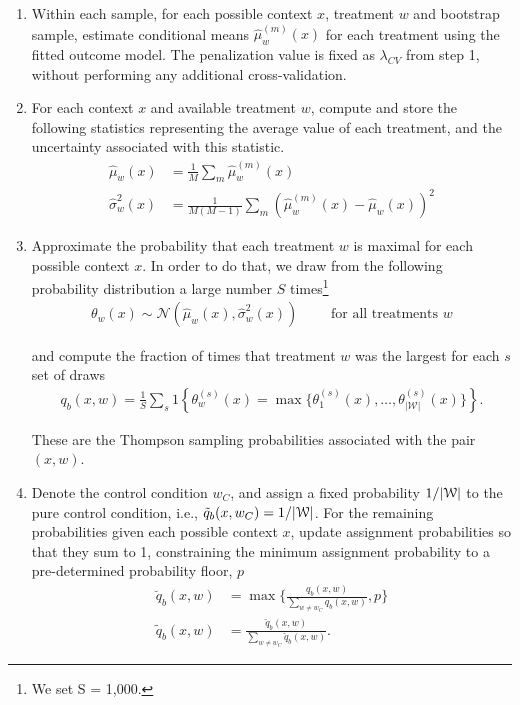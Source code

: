 \documentclass[letterpaper, 12pt, parskip=full,]{scrartcl}
\begin{document}
\begin{enumerate}
\begin{enumerate}
  \item Within each sample, for each possible context $x$, treatment $w$ and bootstrap sample, estimate conditional means  $\hat{\mu}_w^{(m)}(x)$ for each treatment using the fitted outcome model. The penalization value is fixed as $\lambda_{CV}$ from step 1, without performing any additional cross-validation.
  
  \item For each context $x$ and available treatment $w$, compute and store the following statistics representing the average value of each treatment, and the uncertainty associated with this statistic.
    \begin{equation}
      \begin{aligned}
        \hat{\mu}_w(x)         &= \frac{1}{M}\sum_{m} \hat{\mu}_w^{(m)}(x) \\
         \hat{\sigma}^{2}_w(x) &= \frac{1}{M(M-1)} \sum_{m} (\hat{\mu}_w^{(m)}(x) - \hat{\mu}_w(x))^2
      \end{aligned}
    \end{equation}

  \item \label{step:prob} Approximate the probability that each treatment $w$ is maximal for each possible context $x$. In order to do that, we draw from the following probability distribution a large number $S$ times\footnote{We set S = 1,000.}
  \begin{align}
    \theta_{w}(x) \sim \mathcal{N}(\hat{\mu}_w(x), \hat{\sigma}_w^{2}(x)) \qquad %
    \text{ for all treatments }w
  \end{align}

  and compute the fraction of times that treatment $w$ was the largest for each $s$ set of draws
  \begin{align}
    q_{b}(x, w) = \frac{1}{S} \sum_{s} 1\left\{ \theta_{w}^{(s)}(x) = \max \{\theta_{1}^{(s)}(x), \dots, \theta_{|\mathcal{W}|}^{(s)}(x) \}  \right\}. 
  \end{align}

  These are the Thompson sampling probabilities associated with the pair $(x, w)$. 
  
  \item Denote the control condition $w_{C}$, and assign a fixed probability $1/|{\EuScript W}|$ to the pure control condition, i.e., $\tilde{q}_{b}(x, w_{C}) = 1/|{\EuScript W}|$. For the remaining probabilities given each possible context $x$, update assignment probabilities so that they sum to 1, constraining the minimum assignment probability to a pre-determined probability floor, $p$
  \begin{align}
  \breve{q}_{b}(x, w) & =\max\Biggr\{\frac{ q_{b}(x, w)}{\sum\limits_{w \neq w_{C}}q_{b}(x, w) } , p\Biggr\} \\
  \tilde{q}_{b}(x, w) & = \frac{ \breve q_{b}(x, w)}{\sum\limits_{w \neq w_{C}}\breve q_{b}(x, w) }. 
  \end{align}
  

\end{enumerate}
\end{enumerate}
\end{document}
